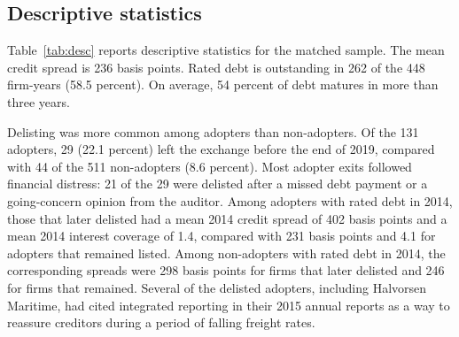 \documentclass[11pt]{article}
\begin{document}
\subsection{Descriptive statistics}

Table~\ref{tab:desc} reports descriptive statistics for the matched sample. The mean credit spread is 236 basis points. Rated debt is outstanding in 262 of the 448 firm-years (58.5 percent). On average, 54 percent of debt matures in more than three years.

Delisting was more common among adopters than non-adopters. Of the 131 adopters, 29 (22.1 percent) left the exchange before the end of 2019, compared with 44 of the 511 non-adopters (8.6 percent). Most adopter exits followed financial distress: 21 of the 29 were delisted after a missed debt payment or a going-concern opinion from the auditor. Among adopters with rated debt in 2014, those that later delisted had a mean 2014 credit spread of 402 basis points and a mean 2014 interest coverage of 1.4, compared with 231 basis points and 4.1 for adopters that remained listed. Among non-adopters with rated debt in 2014, the corresponding spreads were 298 basis points for firms that later delisted and 246 for firms that remained. Several of the delisted adopters, including Halvorsen Maritime, had cited integrated reporting in their 2015 annual reports as a way to reassure creditors during a period of falling freight rates.
\end{document}
